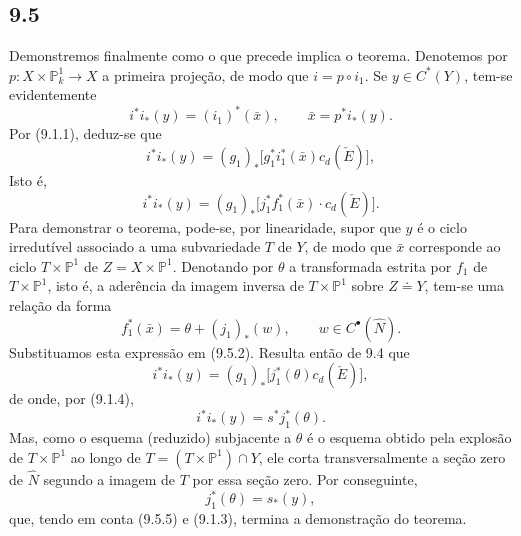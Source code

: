 \subsection*{9.5}

Demonstremos finalmente como o que precede implica o teorema. Denotemos por $p:X\times\mathbb P^1_k\to X$ a primeira projeção, de modo que $i=p\circ i_1$. Se $y\in C^*(Y)$, tem-se evidentemente
\[
i^*i_*(y)=(i_1)^*(\bar x),\qquad \bar x=p^*i_*(y).
\tag{9.5.1}
\]
Por (9.1.1), deduz-se que
\[
i^*i_*(y)=(g_1)_*\bigl[g_1^*i_1^*(\bar x)c_d(\check E)\bigr],
\]
Isto é,
\[
i^*i_*(y)=(g_1)_*\bigl[j_1^*f_1^*(\bar x)\cdot c_d(\check E)\bigr].
\tag{9.5.2}
\]
Para demonstrar o teorema, pode-se, por linearidade, supor que $y$ é o ciclo irredutível associado a uma subvariedade $T$ de $Y$, de modo que $\bar x$ corresponde ao ciclo $T\times\mathbb P^1$ de $Z=X\times\mathbb P^1$. Denotando por $\theta$ a transformada estrita por $f_1$ de $T\times\mathbb P^1$, isto é, a aderência da imagem inversa de $T\times\mathbb P^1$ sobre $Z\doteq Y$, tem-se uma relação da forma
\[
f_1^*(\bar x)=\theta+(j_1)_*(w),\qquad w\in C^{\bullet}(\widehat N).
\tag{9.5.3}
\]
Substituamos esta expressão em (9.5.2). Resulta então de 9.4 que
\[
i^*i_*(y)=(g_1)_*\bigl[j_1^*(\theta)c_d(\check E)\bigr],
\tag{9.5.4}
\]
de onde, por (9.1.4),
\[
i^*i_*(y)=s^*j_1^*(\theta).
\tag{9.5.5}
\]
Mas, como o esquema (reduzido) subjacente a $\theta$ é o esquema obtido pela explosão de $T\times\mathbb P^1$ ao longo de $T=(T\times\mathbb P^1)\cap Y$, ele corta transversalmente a seção zero de $\widehat N$ segundo a imagem de $T$ por essa seção zero. Por conseguinte,
\[
j_1^*(\theta)=s_*(y),
\]
que, tendo em conta (9.5.5) e (9.1.3), termina a demonstração do teorema.
